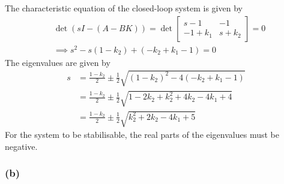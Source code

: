 The characteristic equation of the closed-loop system is given by
\begin{align*}
     &
    \det(sI-(A-BK))
    =
    \det
    \begin{bmatrix}
        s-1      & -1      \\
        -1+k_{1} & s+k_{2}
    \end{bmatrix}
    =
    0
    \\ &
    \implies
    s^2 - s(1-k_2) + (-k_2 + k_1 - 1) = 0
\end{align*}
The eigenvalues are given by
\begin{align*}
    s
     & =
    \frac{1-k_2}{2} \pm \frac{1}{2} \sqrt{{(1-k_2)}^2 - 4(-k_2 + k_1 - 1)}
    \\ & =
    \frac{1-k_2}{2} \pm \frac{1}{2} \sqrt{1 - 2k_2 + k_2^2 + 4k_2 - 4k_1 + 4}
    \\ & =
    \frac{1-k_2}{2} \pm \frac{1}{2} \sqrt{k_2^2 + 2k_2 - 4k_1 + 5}
\end{align*}
For the system to be stabilisable, the real parts of the eigenvalues must be negative.

\subsubsection*{(b)}

